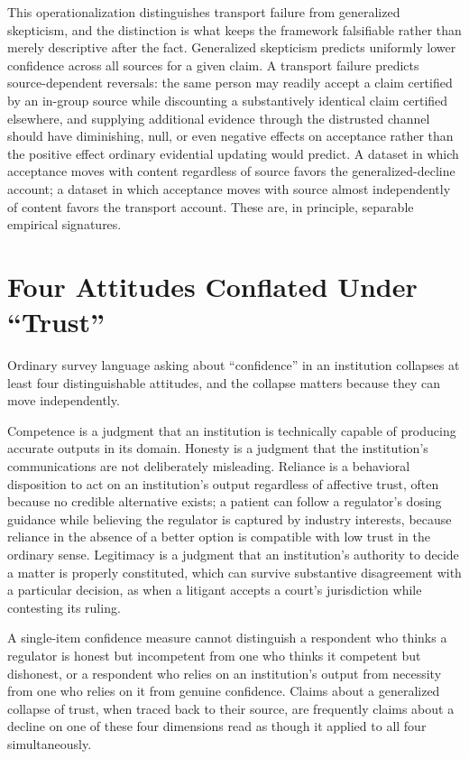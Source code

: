 \documentclass[11pt]{article}
\begin{document}
This operationalization distinguishes transport failure from generalized skepticism, and the distinction is what keeps the framework falsifiable rather than merely descriptive after the fact. Generalized skepticism predicts uniformly lower confidence across all sources for a given claim. A transport failure predicts source-dependent reversals: the same person may readily accept a claim certified by an in-group source while discounting a substantively identical claim certified elsewhere, and supplying additional evidence through the distrusted channel should have diminishing, null, or even negative effects on acceptance rather than the positive effect ordinary evidential updating would predict. A dataset in which acceptance moves with content regardless of source favors the generalized-decline account; a dataset in which acceptance moves with source almost independently of content favors the transport account. These are, in principle, separable empirical signatures.

\section{Four Attitudes Conflated Under ``Trust''}

Ordinary survey language asking about ``confidence'' in an institution collapses at least four distinguishable attitudes, and the collapse matters because they can move independently.

Competence is a judgment that an institution is technically capable of producing accurate outputs in its domain. Honesty is a judgment that the institution's communications are not deliberately misleading. Reliance is a behavioral disposition to act on an institution's output regardless of affective trust, often because no credible alternative exists; a patient can follow a regulator's dosing guidance while believing the regulator is captured by industry interests, because reliance in the absence of a better option is compatible with low trust in the ordinary sense. Legitimacy is a judgment that an institution's authority to decide a matter is properly constituted, which can survive substantive disagreement with a particular decision, as when a litigant accepts a court's jurisdiction while contesting its ruling.

A single-item confidence measure cannot distinguish a respondent who thinks a regulator is honest but incompetent from one who thinks it competent but dishonest, or a respondent who relies on an institution's output from necessity from one who relies on it from genuine confidence. Claims about a generalized collapse of trust, when traced back to their source, are frequently claims about a decline on one of these four dimensions read as though it applied to all four simultaneously.
\end{document}
